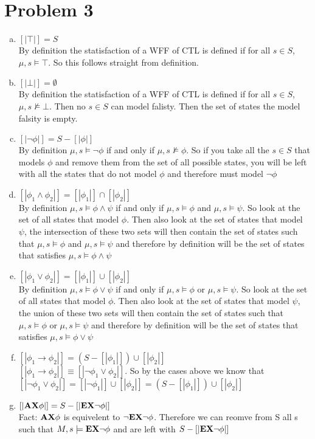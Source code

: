 \documentclass[11pt,leqno,fleqn]{article}
\begin{document}
\section{Problem 3}
	\begin{enumerate}[(a)]
	\item $[|\top|] = S$\\
	By definition the statisfaction of a WFF of CTL is defined if for all $s \in S$, $\mu, s \models \top$. So this follows straight from definition.
	\item  $[|\bot|] = \emptyset$\\
		By definition the statisfaction of a WFF of CTL is defined if for all $s \in S$, $\mu, s \not\models \bot$. Then no $s \in S$ can model  falisty. Then the set of states the model falsity is empty.
	\item $[|\neg \phi|] = S - [|\phi|]$\\
		By definition $\mu, s \models \neg \phi$ if and only if $\mu, s \not\models \phi$. So if you take all the $s \in S$ that models $\phi$  and remove them from the set of all possible states, you will be left with all the states that do not model $\phi$ and therefore must model $\neg \phi$
	\item $[|\phi_1 \land \phi_2|] = [|\phi_1|] \cap [|\phi_2|]$\\
	By definition  $\mu, s \models \phi \land \psi$ if and only if $\mu, s \models \phi$ and $\mu, s \models \psi$.
	So look at the set of all states that model $\phi$. Then also look at the set of states that model $\psi$, the intersection of these two sets will then contain the set of states such that $\mu, s \models \phi$ and $\mu, s \models \psi$ and therefore by definition will be the set of states that satisfies $\mu, s \models \phi \land \psi$ 
	\item $[|\phi_1 \lor \phi_2|] = [|\phi_1|] \cup [|\phi_2|]$\\
	By definition  $\mu, s \models \phi \lor \psi$ if and only if $\mu, s \models \phi$ or $\mu, s \models \psi$. So look at the set of all states that model $\phi$. Then also look at the set of states that model $\psi$, the union of these two sets will then contain the set of states such that $\mu, s \models \phi$ or $\mu, s \models \psi$ and therefore by definition will be the set of states that satisfies $\mu, s \models \phi \lor \psi$ 
	
	\item $[|\phi_1 \to \phi_2|] = (S- [|\phi_1|]) \cup [|\phi_2|]$\\
	 $[|\phi_1 \to \phi_2|] \equiv [|\neg \phi_1 \lor \phi_2|]$. So by the cases above we know  that $[|\neg \phi_1 \lor \phi_2|] =  [| \neg \phi_1|] \cup [|\phi_2|] =  (S - [|\phi_1|]) \cup [|\phi_2|] $
	 
	\item $[| \bold{AX} \phi|] = S - [|\bold{EX} \neg \phi|]  $\\
	Fact: $\bold{AX} \phi$ is equivelent to $\neg  \bold{EX} \neg \phi$. Therefore we can reomve from S all s such that $M,s \models \bold{EX} \neg \phi$ and are left with $S-[|\bold{EX}\neg \phi|]$
	
	\end{enumerate}
\end{document}
